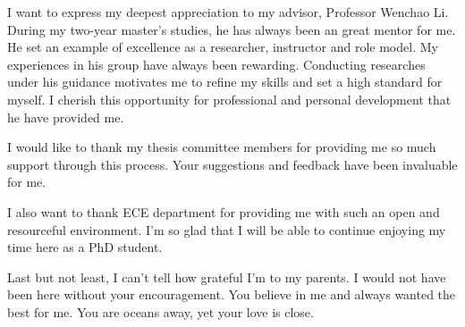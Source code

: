I want to express my deepest appreciation to my advisor, Professor Wenchao Li.
During my two-year master's studies, he has always been an great mentor for me. 
He set an example of excellence as a researcher, instructor and role model.
My experiences in his group have always been rewarding. 
Conducting researches under his guidance motivates me to refine my skills and set a high standard for myself. 
I cherish this opportunity for professional and personal development that he have provided me.

I would like to thank my thesis committee members for providing me so much support through this process. 
Your suggestions and feedback have been invaluable for me.

I also want to thank ECE department for providing me with such an open and resourceful environment. 
I'm so glad that I will be able to continue enjoying my time here as a PhD student.

Last but not least, I can't tell how grateful I'm to my parents.
I would not have been here without your encouragement. You believe in me and always wanted the best for me.
You are oceans away, yet your love is close.

\vskip 1in

